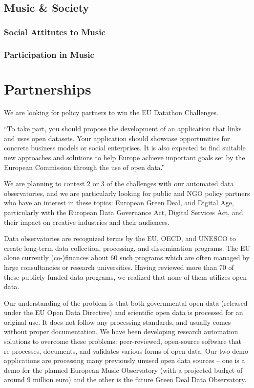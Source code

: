 \documentclass[
  a4paper,
  openany, a4paper, oneside]{book}
\begin{document}
\hypertarget{music-society}{%
\section{Music \& Society}\label{music-society}}

\hypertarget{social-attitutes-to-music}{%
\subsection{Social Attitutes to Music}\label{social-attitutes-to-music}}

\hypertarget{participation-in-music}{%
\subsection{Participation in Music}\label{participation-in-music}}

\hypertarget{partnerships}{%
\chapter{Partnerships}\label{partnerships}}

We are looking for policy partners to win the EU Datathon Challenges.

``To take part, you should propose the development of an application that links and uses open datasets. Your application should showcase opportunities for concrete business models or social enterprises. It is also expected to find suitable new approaches and solutions to help Europe achieve important goals set by the European Commission through the use of open data.''

We are planning to contest 2 or 3 of the challenges with our automated data observatories, and we are particularly looking for public and NGO policy partners who have an interest in these topics: European Green Deal, and Digital Age, particularly with the European Data Governance Act, Digital Services Act, and their impact on creative industries and their audiences.

Data observatories are recognized terms by the EU, OECD, and UNESCO to create long-term data collection, processing, and dissemination programs. The EU alone currently (co-)finances about 60 such programs which are often managed by large consultancies or research universities. Having reviewed more than 70 of these publicly funded data programs, we realized that none of them utilizes open data.

Our understanding of the problem is that both governmental open data (released under the EU Open Data Directive) and scientific open data is processed for an original use. It does not follow any processing standards, and usually comes without proper documentation. We have been developing research automation solutions to overcome these problems: peer-reviewed, open-source software that re-processes, documents, and validates various forms of open data. Our two demo applications are processing many previously unused open data sources -- one is a demo for the planned European Music Observatory (with a projected budget of around 9 million euro) and the other is the future Green Deal Data Observatory.
\end{document}
